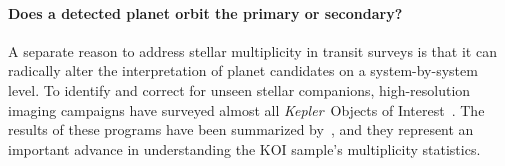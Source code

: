 \documentclass[12pt,modern]{aastex61}
\begin{document}

\paragraph{Does a detected planet orbit the primary or secondary?}

A separate reason to address stellar multiplicity in transit surveys
is that it can radically alter the interpretation of planet candidates
on a system-by-system level.  To identify and correct for unseen
stellar companions, high-resolution imaging campaigns have surveyed
almost all {\it Kepler}\ Objects of Interest~\citep{
  howell_speckle_2011,adams_adaptive_2012,adams_adaptive_2013,horch_observations_2012,
  horch_most_2014,lillo-box_multiplicity_2012,lillo-box_high-resolution_2014,dressing_adaptive_2014,
  law_robotic_2014,cartier_revision_2015,everett_high-resolution_2015,gilliland_hubble_2015,
  wang_influence_2015,wang_influence_2015-1,baranec_robo-ao_2016,ziegler_robo-ao_2017}.
The results of these programs have been summarized
by~\citet{furlan_kepler_2017}, and they represent an important advance
in understanding the KOI sample's multiplicity statistics.
\end{document}
